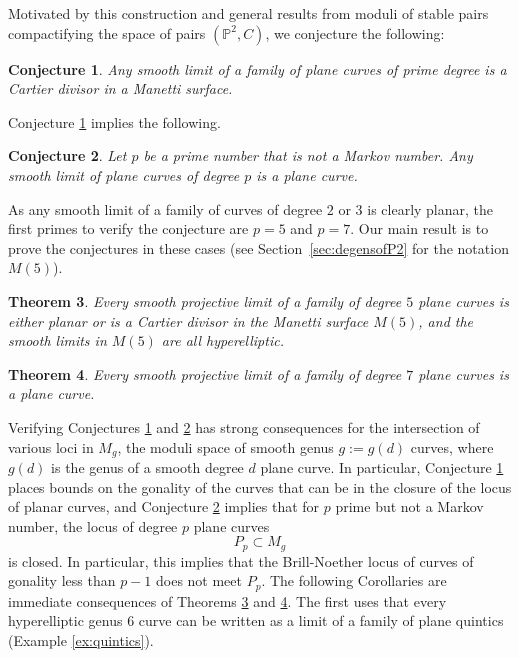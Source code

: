 \documentclass[JEP,XML,SOM,Unicode,NoFloatCountersInSection,published]{cedram}
\theoremstyle{plain}
\newtheorem{Theorem}{Theorem}
\newtheorem{Conj}[Theorem]{Conjecture}
\theoremstyle{definition}
\newcommand\PP{{\mathbb{P}}}
\begin{document}
Motivated by this construction and general results from moduli of stable pairs compactifying the space of pairs $(\PP^2, C)$, we conjecture the following:

\begin{Conj}\label{conjB}
Any smooth limit of a family of plane curves of prime degree is a Cartier divisor in a Manetti surface.
\end{Conj}

Conjecture \ref{conjB} implies the following.

\begin{Conj}\label{conjC}
Let $p$ be a prime number that is not a Markov number. Any smooth limit of plane curves of degree $p$ is a plane curve.
\end{Conj}

As any smooth limit of a family of curves of degree $2$ or $3$ is clearly planar, the first primes to verify the conjecture are $p =5$ and $p = 7$. Our main result is to prove the conjectures in these cases (see Section~\ref{sec:degensofP2} for the notation $M(5)$).

\begin{Theorem}\label{thmD:deg5}
Every smooth projective limit of a family of degree $5$ plane curves is either planar or is a Cartier divisor in the Manetti surface $M(5)$, and the smooth limits in $M(5)$ are all hyperelliptic.
\end{Theorem}

\begin{Theorem}\label{thmE:deg7}
Every smooth projective limit of a family of degree $7$ plane curves is a plane curve.
\end{Theorem}

Verifying Conjectures \ref{conjB} and \ref{conjC} has strong consequences for the intersection of various loci in $M_{g}$, the moduli space of smooth genus $g := g(d)$ curves, where $g(d)$ is the genus of a smooth degree $d$ plane curve. In particular, Conjecture \ref{conjB} places bounds on the gonality of the curves that can be in the closure of the locus of planar curves, and Conjecture \ref{conjC} implies that for $p$ prime but not a Markov number, the locus of degree $p$ plane curves
\[
P_p\subset M_g
\]
is closed. In particular, this implies that the Brill-Noether locus of curves of gonality less than $p-1$ does not meet $P_p$. The following Corollaries are immediate consequences of Theorems \ref{thmD:deg5} and \ref{thmE:deg7}. The first uses that every hyperelliptic genus 6 curve can be written as a limit of a family of plane quintics (Example \ref{ex:quintics}).
\end{document}
